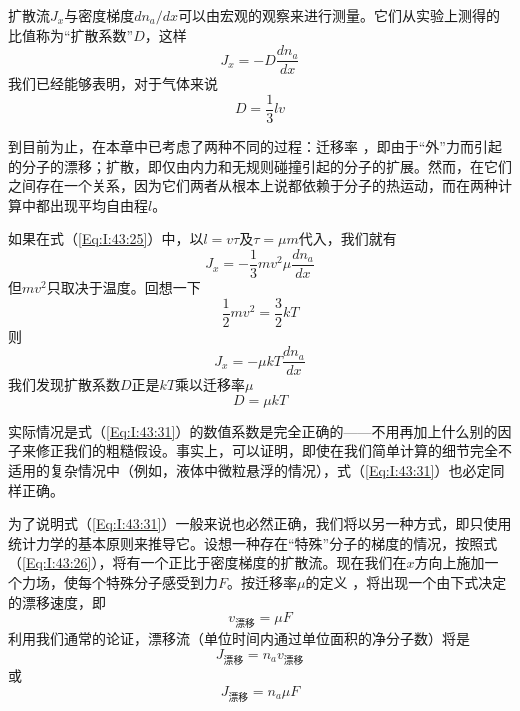 扩散流$J_x$与密度梯度$dn_a /dx$可以由宏观的观察来进行测量。它们从实验上测得的比值称为“扩散系数”$D$，这样
\begin{equation}
    \label{Eq:I:43:26}
    J_x = -D\frac{dn_a}{dx}
\end{equation}
我们已经能够表明，对于气体来说
\begin{equation}
    \label{Eq:I:43:27}
    D=\frac{1}{3}lv
\end{equation}

到目前为止，在本章中已考虑了两种不同的过程：迁移率 ，即由于“外”力而引起的分子的漂移；扩散，即仅由内力和无规则碰撞引起的分子的扩展。然而，在它们之间存在一个关系，因为它们两者从根本上说都依赖于分子的热运动，而在两种计算中都出现平均自由程$l$。

如果在式（\ref{Eq:I:43:25}）中，以$l =v\tau$及$\tau=\mu m$代入，我们就有
\begin{equation}
    \label{Eq:I:43:28}
    J_x = -\frac{1}{3}mv^2\mu\frac{dn_a}{dx}
\end{equation}
但$mv^2$只取决于温度。回想一下
\begin{equation}
    \label{Eq:I:43:29}
    \frac{1}{2}mv^2=\frac{3}{2}kT
\end{equation}
则
\begin{equation}
    \label{Eq:I:43:30}
    J_x = -\mu kT\frac{dn_a}{dx}
\end{equation}
我们发现扩散系数$D$正是$kT$乘以迁移率$\mu$
\begin{equation}
    \label{Eq:I:43:31}
    D=\mu kT
\end{equation}

实际情况是式（\ref{Eq:I:43:31}）的数值系数是完全正确的——不用再加上什么别的因子来修正我们的粗糙假设。事实上，可以证明，即使在我们简单计算的细节完全不适用的复杂情况中（例如，液体中微粒悬浮的情况），式（\ref{Eq:I:43:31}）也必定同样正确。

为了说明式（\ref{Eq:I:43:31}）一般来说也必然正确，我们将以另一种方式，即只使用统计力学的基本原则来推导它。设想一种存在“特殊”分子的梯度的情况，按照式（\ref{Eq:I:43:26}），将有一个正比于密度梯度的扩散流。现在我们在$x$方向上施加一个力场，使每个特殊分子感受到力$F$。按迁移率$\mu$的定义 ，将出现一个由下式决定的漂移速度，即
\begin{equation}
    \label{Eq:I:43:32}
    v_\text{漂移}=\mu F
\end{equation}
利用我们通常的论证，漂移流（单位时间内通过单位面积的净分子数）将是
\begin{equation}
    \label{Eq:I:43:33}
    J_\text{漂移} = n_av_\text{漂移}
\end{equation}
或
\begin{equation}
    \label{Eq:I:43:34}
    J_\text{漂移} = n_a\mu F
\end{equation}

